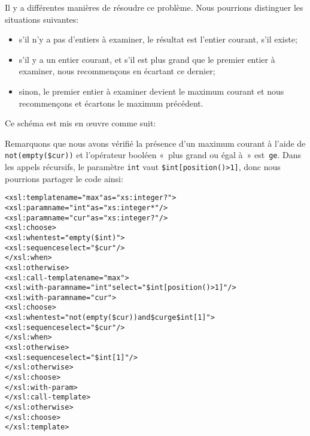 Il y a différentes manières de résoudre ce problème. Nous pourrions
distinguer les situations suivantes:
\begin{itemize}

  \item s'il n'y a pas d'entiers à examiner, le résultat est l'entier
    courant, s'il existe;

  \item s'il y a un entier courant, et s'il est plus grand que le
    premier entier à examiner, nous recommençons en écartant ce
    dernier;

  \item sinon, le premier entier à examiner devient le maximum courant
    et nous recommençons et écartons le maximum précédent.

\end{itemize}
Ce schéma est mis en {\oe}uvre comme suit:
Remarquons que nous avons vérifié la présence d'un maximum courant à
l'aide de \texttt{not(empty(\$cur))} et l'opérateur booléen \XPath
«~plus grand ou égal à~» est~\texttt{ge}. Dans les appels récursifs, le
paramètre \texttt{int} vaut \texttt{\$int[position()>1]}, donc nous
pourrions partager le code ainsi:
\begin{alltt}
\small<xsl:template name="max" as="xs:integer?">
  <xsl:param name="int" as="xs:integer*"/>
  <xsl:param name="cur" as="xs:integer?"/>
  <xsl:choose>
    <xsl:when test="empty(\$int)">
      <xsl:sequence select="\$cur"/>
    </xsl:when>
    <xsl:otherwise>
      <xsl:call-template name="max">
        <xsl:with-param name="int" select="\$int[position()>1]"/>
        <xsl:with-param name="cur">
          <xsl:choose>
            <xsl:when test="not(empty(\$cur))\! and\! \$cur ge \$int[1]">
              <xsl:sequence select="\$cur"/>
            </xsl:when>
            <xsl:otherwise>
              <xsl:sequence select="\$int[1]"/>
            </xsl:otherwise>
          </xsl:choose>
        </xsl:with-param>
      </xsl:call-template>
    </xsl:otherwise>
  </xsl:choose>
</xsl:template>
\end{alltt}
